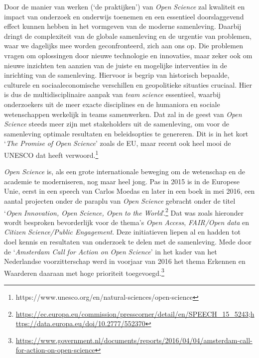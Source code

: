 \documentclass[smallauthor, chapterhaspagenum, nochapterinheader, pagenuminheader,  bigchapnum,medium2, tocpages,  garamond, titleinheader]{jote-book}
\begin{document}
	Door de manier van werken (‘de praktijken') van \emph{Open }\emph{Science} zal kwaliteit en impact van onderzoek en onderwijs toenemen en een essentieel doorslaggevend effect kunnen hebben in het vormgeven van de moderne samenleving. Daarbij dringt de complexiteit van de globale samenleving en de urgentie van problemen, waar we dagelijks mee worden geconfronteerd, zich aan ons op. Die problemen vragen om oplossingen door nieuwe technologie en innovaties, maar zeker ook om nieuwe inzichten ten aanzien van de juiste en mogelijke interventies in de inrichting van de samenleving. Hiervoor is begrip van historisch bepaalde, culturele en sociaaleconomische verschillen en geopolitieke situaties cruciaal. Hier is dus de multidisciplinaire aanpak van \emph{team }\emph{science} essentieel, waarbij onderzoekers uit de meer exacte disciplines en de humaniora en sociale wetenschappen werkelijk in teams samenwerken. Dat zal in de geest van \emph{Open }\emph{Science} steeds meer zijn met stakeholders uit de samenleving, om voor de samenleving optimale resultaten en beleidsopties te genereren. Dit is in het kort ‘\emph{The }\emph{Promise}\emph{ of }\emph{Open }\emph{Science}' zoals de EU, maar recent ook heel mooi de UNESCO dat heeft verwoord.\footnote{https://www.unesco.org/en/natural-sciences/open-science}



	\emph{Open }\emph{Science} is, als een grote internationale beweging om de wetenschap en de academie te moderniseren, nog maar heel jong. Pas in 2015 is in de Europese Unie, eerst in een speech van Carlos Moedas en later in een boek in mei 2016, een aantal projecten onder de paraplu van \emph{Open }\emph{Science} gebracht onder de titel ‘\emph{Open }\emph{Innovation}\emph{, Open }\emph{Science}\emph{, Open }\emph{to}\emph{ }\emph{the}\emph{ World}'.\footnote{\href{https://ec.europa.eu/commission/presscorner/detail/en/SPEECH_15_5243}{https://ec.europa.eu/commission/presscorner/detail/en/SPEECH\_15\_5243};\href{https://data.europa.eu/doi/10.2777/552370}{https://data.europa.eu/doi/10.2777/552370}} Dat was zoals hieronder wordt besproken bevorderlijk voor de thema's \emph{Open Access}, \emph{FAIR/Open data} en \emph{Citizen}\emph{ }\emph{Science}\emph{/Public Engagement}. Deze initiatieven liepen al en hadden tot doel kennis en resultaten van onderzoek te delen met de samenleving. Mede door de ‘\emph{Amsterdam Call }\emph{for}\emph{ Action on }\emph{Open }\emph{Science}' in het kader van het Nederlandse voorzitterschap werd in voorjaar van 2016 het thema Erkennen en Waarderen daaraan met hoge prioriteit toegevoegd.\footnote{\href{https://www.government.nl/documents/reports/2016/04/04/amsterdam-call-for-action-on-open-science}{https://www.government.nl/documents/reports/2016/04/04/amsterdam-call-for-action-on-open-science}}
\end{document}
